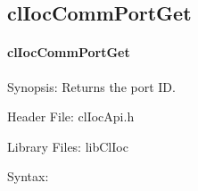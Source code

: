 \begin{flushleft}
\subsection{clIocCommPortGet}
\hypertarget{pageIOC102}{}\paragraph{cl\-Ioc\-Comm\-Port\-Get}\label{pageIOC102}
\begin{Desc}
\item[Synopsis: ]Returns the port ID.\end{Desc}
\begin{Desc}
\item[Header File:]clIocApi.h\end{Desc}
\begin{Desc}
\item[Library Files:]libClIoc\end{Desc}
\begin{Desc}
\item[Syntax: ]


\end{Desc}
\end{flushleft}
